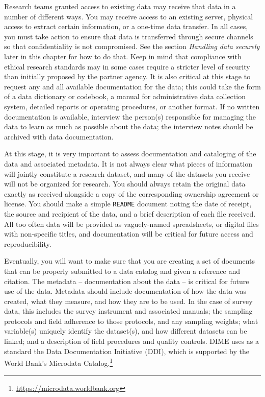 \documentclass[
]{book}
\begin{document}
Research teams granted access to existing data may receive that data in a number of different ways.
You may receive access to an existing server,
physical access to extract certain information,
or a one-time data transfer.
In all cases, you must take action to ensure
that data is transferred through
secure channels so that confidentiality is not compromised.
See the section \emph{Handling data securely} later in this chapter for how to do that.
Keep in mind that compliance with ethical research standards may
in some cases require a stricter level of security than initially proposed by the partner agency.
It is also critical at this stage to request any and all available documentation for the data;
this could take the form of a data dictionary or codebook,
a manual for administrative data collection system, detailed reports or operating procedures,
or another format.
If no written documentation is available,
interview the person(s) responsible for managing the data
to learn as much as possible about the data;
the interview notes should be archived with data documentation.

At this stage, it is very important to assess
documentation and cataloging of the data and associated metadata.
It is not always clear what pieces of information will jointly constitute a research dataset,
and many of the datasets you receive will not be organized for research.
You should always retain the original data exactly as received
alongside a copy of the corresponding ownership agreement or license.
You should make a simple \texttt{README} document noting the date of receipt,
the source and recipient of the data,
and a brief description of each file received.
All too often data will be provided as vaguely-named spreadsheets,
or digital files with non-specific titles,
and documentation will be critical for future access and reproducibility.

Eventually, you will want to make sure that you are creating a set of documents
that can be properly submitted to a data catalog and given a reference and citation.
The metadata -- documentation about the data -- is critical for future use of the data.
Metadata should include documentation of how the data was created,
what they measure, and how they are to be used.
In the case of survey data, this includes the survey instrument and associated manuals;
the sampling protocols and field adherence to those protocols, and any sampling weights;
what variable(s) uniquely identify the dataset(s), and how different datasets can be linked;
and a description of field procedures and quality controls.
DIME uses as a standard the Data Documentation Initiative (DDI), which is supported by the
World Bank's Microdata Catalog.\footnote{\url{https://microdata.worldbank.org}}
\end{document}
